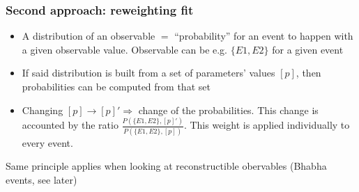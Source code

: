 \documentclass{beamer}
\begin{document}
\begin{frame}
\frametitle{Second approach: reweighting fit}
\begin{itemize}
  \item A \alert{distribution} of an observable $=$ \alert{``probability''} for
  an event to happen with a given observable value. Observable can be e.g.
  $\{E1,E2\}$ for a given event%
  \item If said distribution is built from a set of parameters' values
  $[p]$, then probabilities can be computed from that set
  \item Changing $[p]\to [p]'\Rightarrow$ change of the probabilities. This
  change is accounted by the ratio $\frac{P(\{E1,E2\},
  [p]')}{P(\{E1,E2\},[p])}$. This weight is applied individually to every
  event.
\end{itemize}
Same principle applies when looking at reconstructible obervables (Bhabha
events, see later)
\end{frame}
\end{document}
